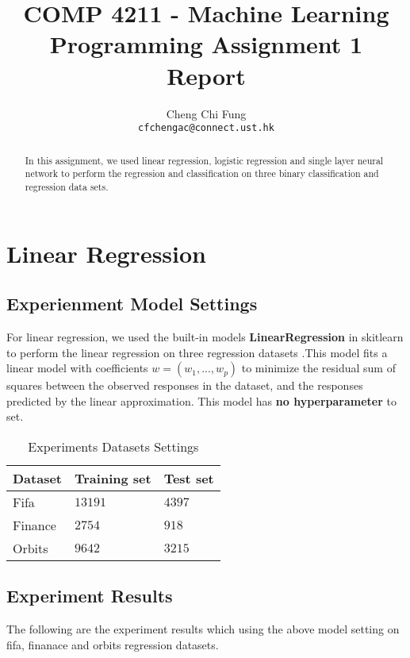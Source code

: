 \documentclass{article}
\title{COMP 4211 - Machine Learning Programming Assignment 1 Report}
\author{%
	Cheng Chi Fung \\
	\texttt{cfchengac@connect.ust.hk} \\
}
\begin{document}
\maketitle

\begin{abstract}
  In this assignment, we used linear regression, logistic regression and single layer neural network to perform the regression and classification on three binary classification and regression data sets.
  
\end{abstract}

\section{Linear Regression}

\subsection{Experienment Model Settings}

For linear regression, we used the built-in models   \textbf{LinearRegression} in skitlearn to perform the linear regression on three regression datasets .This model fits a linear model with coefficients  	$w = (w_1,..., w_p)$  to minimize the residual sum of squares between the observed responses in the dataset, and the responses predicted by the linear approximation. This model has \textbf{no hyperparameter} to set.

\begin{table}[htb]
	\caption{Experiments Datasets Settings}
	\label{sample-table}
	\centering
	\begin{tabular}{lll}
		\toprule
		\cmidrule{1-3}
		Dataset & Training set & Test set \\
		\midrule
		Fifa & $13191$ & $4397$ \\
		Finance & $2754$ & $918$ \\
		Orbits & $9642$ & $3215$ \\
		\bottomrule
	\end{tabular}
\end{table}

\subsection{Experiment Results}

The following are the experiment results which using the above model setting on fifa, finanace and orbits regression datasets.
\end{document}

